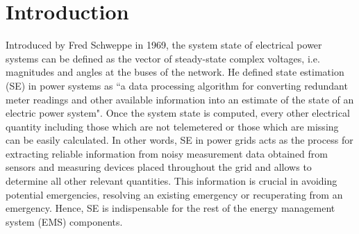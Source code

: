 \documentclass[thesis.tex]{subfiles}
\begin{document}
\chapter{Introduction}
\label{chap:introduction}



Introduced by Fred Schweppe\cite{Schweppe} in 1969, the system state of electrical power systems can be defined as the vector of steady-state complex voltages, i.e. magnitudes and angles at the buses of the network. He defined state estimation (SE) in power systems as “a data processing algorithm for converting redundant meter readings and other available information into an estimate of the state of an electric power system"\cite{Schweppe}. Once the system state is computed, every other electrical quantity including those which are not telemetered or those which are missing can be easily calculated. In other words, SE in power grids acts as the process for extracting reliable information from noisy measurement data obtained from sensors and measuring devices placed throughout the grid and allows to determine all other relevant quantities. This information is crucial in avoiding potential emergencies, resolving an existing emergency or recuperating from an emergency\cite{Liacco}. Hence, SE is indispensable for the rest of the energy management system (EMS) components.\\\\
\end{document}
